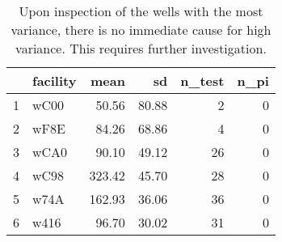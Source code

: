 \begin{table}[h]
\centering
\begin{tabular}{rlrrrr}
  \hline
 & facility & mean & sd & n\_test & n\_pi \\ 
  \hline
1 & wC00 & 50.56 & 80.88 &   2 &   0 \\ 
  2 & wF8E & 84.26 & 68.86 &   4 &   0 \\ 
  3 & wCA0 & 90.10 & 49.12 &  26 &   0 \\ 
  4 & wC98 & 323.42 & 45.70 &  28 &   0 \\ 
  5 & w74A & 162.93 & 36.06 &  36 &   0 \\ 
  6 & w416 & 96.70 & 30.02 &  31 &   0 \\ 
   \hline
\end{tabular}
\caption{Upon inspection of the wells with the most variance, there is no immediate cause for high variance. This requires further investigation.} 
\label{tab:well_summaries}
\end{table}
